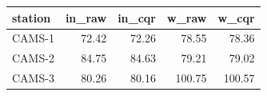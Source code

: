 \begin{tabular}{lrrrr}
\toprule
station & in_raw & in_cqr & w_raw & w_cqr \\
\midrule
CAMS-1 & 72.42 & 72.26 & 78.55 & 78.36 \\
CAMS-2 & 84.75 & 84.63 & 79.21 & 79.02 \\
CAMS-3 & 80.26 & 80.16 & 100.75 & 100.57 \\
\bottomrule
\end{tabular}
